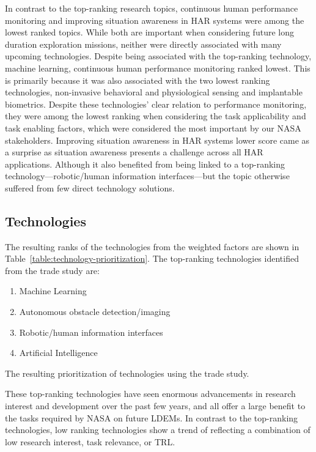 In contrast to the top-ranking research topics, continuous human performance monitoring and improving situation awareness in HAR systems were among the lowest ranked topics.
While both are important when considering future long duration exploration missions, neither were directly associated with many upcoming technologies.
Despite being associated with the top-ranking technology, machine learning, continuous human performance monitoring ranked lowest.
This is primarily because it was also associated with the two lowest ranking technologies, non-invasive behavioral and physiological sensing and implantable biometrics.
Despite these technologies' clear relation to performance monitoring, they were among the lowest ranking when considering the task applicability and task enabling factors, which were considered the most important by our NASA stakeholders.
Improving situation awareness in HAR systems lower score came as a surprise as situation awareness presents a challenge across all HAR applications.
Although it also benefited from being linked to a top-ranking technology—robotic/human information interfaces—but the topic otherwise suffered from few direct technology solutions.

\subsection{Technologies}
The resulting ranks of the technologies from the weighted factors are shown in Table~\ref{table:technology-prioritization}.
The top-ranking technologies identified from the trade study are:
\begin{enumerate}
    \item Machine Learning
    \item Autonomous obstacle detection/imaging
    \item Robotic/human information interfaces
    \item Artificial Intelligence
\end{enumerate}

\begin{table}[tb]
    \centering
    \caption[Technology prioritization]{The resulting prioritization of technologies using the trade study.}
    \label{table:technology-prioritization}
\end{table}

These top-ranking technologies have seen enormous advancements in research interest and development over the past few years, and all offer a large benefit to the tasks required by NASA on future LDEMs.
In contrast to the top-ranking technologies, low ranking technologies show a trend of reflecting a combination of low research interest, task relevance, or TRL.

